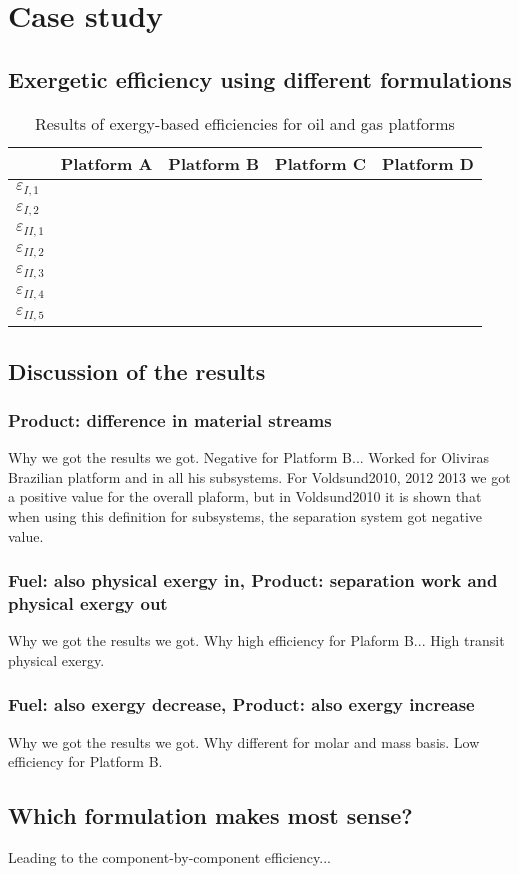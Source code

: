 \section{Case study}
\label{sec:comparison}

\subsection{Exergetic efficiency using different formulations}

\begin{table*}[htbp]
\scriptsize
  \centering
  \caption{Results of exergy-based efficiencies for oil and gas platforms}
    \begin{tabular*}{\linewidth}{@{\extracolsep{\fill}}lllll}
    \toprule
          & Platform A & Platform B & Platform C & Platform D \\
	\toprule
	$\varepsilon_{I,1}$ & & & & \\
	$\varepsilon_{I,2}$ & & & & \\
	$\varepsilon_{II,1}$ & & & & \\
	$\varepsilon_{II,2}$ & & & & \\
    $\varepsilon_{II,3}$ & & & & \\
	$\varepsilon_{II,4}$ & & & & \\
	$\varepsilon_{II,5}$ & & & & \\
   	\bottomrule
    \end{tabular*}%
  \label{tab:results_efficiency}%
\end{table*}%

\subsection{Discussion of the results}

\subsubsection{Product: difference in material streams}
Why we got the results we got. Negative for Platform B... Worked for Oliviras Brazilian platform and in all his subsystems. For Voldsund2010, 2012 2013 we got a positive value for the overall plaform, but in Voldsund2010 it is shown that when using this definition for subsystems, the separation system got negative value. 

\subsubsection{Fuel: also physical exergy in, Product: separation work and physical exergy out}
Why we got the results we got. Why high efficiency for Plaform B... High transit physical exergy.

\subsubsection{Fuel: also exergy decrease, Product: also exergy increase}
Why we got the results we got. Why different for molar and mass basis. Low efficiency for Platform B.

\subsection{Which formulation makes most sense?}
Leading to the component-by-component efficiency...